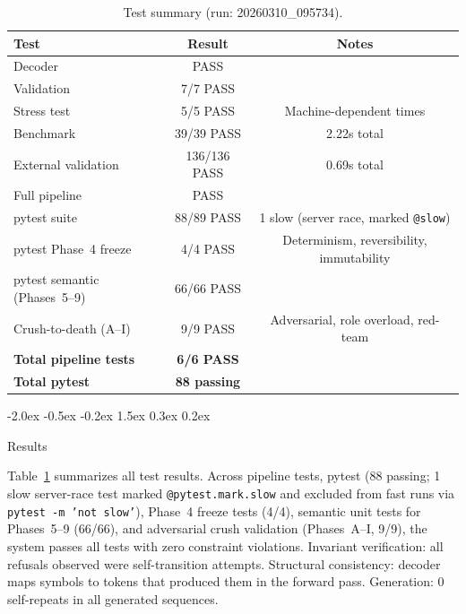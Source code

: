 \documentclass[10pt]{article}
\makeatletter
\renewcommand{\section}{\@startsection{section}{1}{\z@}%
  {-2.0ex \@plus -0.5ex \@minus -0.2ex}%
  {1.5ex \@plus 0.3ex \@minus 0.2ex}%
  {\large\bfseries\raggedright}}
\makeatother
\begin{document}
\begin{table}[t]
\centering
\caption{Test summary (run: 20260310\_095734).}
\label{tab:summary}
\begin{tabular}{lcc}
\toprule
\textbf{Test} & \textbf{Result} & \textbf{Notes} \\
\midrule
Decoder & PASS & \\
Validation & 7/7 PASS & \\
Stress test & 5/5 PASS & Machine-dependent times \\
Benchmark & 39/39 PASS & 2.22s total \\
External validation & 136/136 PASS & 0.69s total \\
Full pipeline & PASS & \\
\midrule
pytest suite & 88/89 PASS & 1 slow (server race, marked \texttt{@slow}) \\
pytest Phase~4 freeze & 4/4 PASS & Determinism, reversibility, immutability \\
pytest semantic (Phases~5--9) & 66/66 PASS & \\
Crush-to-death (A--I) & 9/9 PASS & Adversarial, role overload, red-team \\
\midrule
\textbf{Total pipeline tests} & \textbf{6/6 PASS} & \\
\textbf{Total pytest} & \textbf{88 passing} & \\
\bottomrule
\end{tabular}
\end{table}

\section{Results}
\label{sec:results}

Table~\ref{tab:summary} summarizes all test results. Across pipeline tests, pytest
(88 passing; 1 slow server-race test marked \texttt{@pytest.mark.slow} and excluded
from fast runs via \texttt{pytest -m 'not slow'}), Phase~4 freeze tests (4/4),
semantic unit tests for Phases~5--9 (66/66), and adversarial crush validation
(Phases~A--I, 9/9), the system passes all tests with zero constraint violations.
Invariant verification: all refusals observed were self-transition attempts. Structural
consistency: decoder maps symbols to tokens that produced them in the forward pass.
Generation: 0 self-repeats in all generated sequences.
\end{document}
